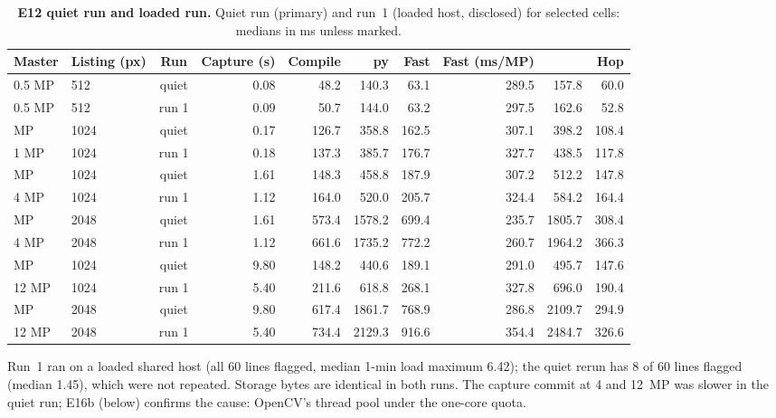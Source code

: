 \documentclass[10pt]{article}
\begin{document}
\begin{table}[!htbp]
\centering\tabsize
\caption{\textbf{E12 quiet run and loaded run.} Quiet run (primary) and run~1 (loaded host, disclosed) for selected cells: medians in ms unless marked.}
\label{tab:e12-runs}
\setlength{\tabcolsep}{4pt}
\begin{tabular}{@{}llcrrrrrrr@{}}
\toprule
Master & Listing (px) & Run & Capture (s) & Compile & \VerifyE{} py & Fast & Fast (ms/MP) & \Evaluate{} & Hop \\
\midrule
0.5 MP & 512 & quiet & 0.08 & 48.2 & 140.3 & 63.1 & 289.5 & 157.8 & 60.0 \\
0.5 MP & 512 & run 1 & 0.09 & 50.7 & 144.0 & 63.2 & 297.5 & 162.6 & 52.8 \\
\addlinespace[2pt]
1 MP & 1024 & quiet & 0.17 & 126.7 & 358.8 & 162.5 & 307.1 & 398.2 & 108.4 \\
1 MP & 1024 & run 1 & 0.18 & 137.3 & 385.7 & 176.7 & 327.7 & 438.5 & 117.8 \\
\addlinespace[2pt]
4 MP & 1024 & quiet & 1.61 & 148.3 & 458.8 & 187.9 & 307.2 & 512.2 & 147.8 \\
4 MP & 1024 & run 1 & 1.12 & 164.0 & 520.0 & 205.7 & 324.4 & 584.2 & 164.4 \\
\addlinespace[2pt]
4 MP & 2048 & quiet & 1.61 & 573.4 & 1578.2 & 699.4 & 235.7 & 1805.7 & 308.4 \\
4 MP & 2048 & run 1 & 1.12 & 661.6 & 1735.2 & 772.2 & 260.7 & 1964.2 & 366.3 \\
\addlinespace[2pt]
12 MP & 1024 & quiet & 9.80 & 148.2 & 440.6 & 189.1 & 291.0 & 495.7 & 147.6 \\
12 MP & 1024 & run 1 & 5.40 & 211.6 & 618.8 & 268.1 & 327.8 & 696.0 & 190.4 \\
\addlinespace[2pt]
12 MP & 2048 & quiet & 9.80 & 617.4 & 1861.7 & 768.9 & 286.8 & 2109.7 & 294.9 \\
12 MP & 2048 & run 1 & 5.40 & 734.4 & 2129.3 & 916.6 & 354.4 & 2484.7 & 326.6 \\
\bottomrule
\end{tabular}
\end{table}
Run~1 ran on a loaded shared host (all 60 lines flagged, median 1-min load maximum 6.42); the quiet rerun has 8 of 60
lines flagged (median 1.45), which were not repeated. Storage bytes are identical in both runs. The capture commit at
4 and 12~MP was slower in the quiet run; E16b (below) confirms the cause: OpenCV's thread pool under the one-core quota.
\end{document}
